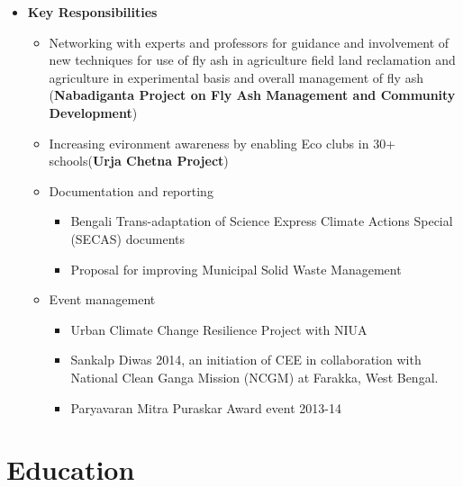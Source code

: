 \documentclass[11pt,a4paper,sans]{moderncv}        %
\begin{document}
\begin{itemize}
    \vspace{4mm}
    \item{}
    \vspace{2mm}

    \textbf{Key Responsibilities}

    \begin{itemize}
            \item Networking with experts and professors for guidance and involvement of new techniques for use of fly
                  ash in agriculture field land reclamation and agriculture in experimental basis and overall management
                  of fly ash (\textbf{Nabadiganta Project on Fly Ash Management and Community Development})
            \item Increasing evironment awareness by enabling Eco clubs in 30+ schools(\textbf{Urja Chetna Project})
            \item Documentation and reporting
            \begin{itemize}
                \item Bengali Trans-adaptation of Science Express Climate Actions Special (SECAS) documents
                \item Proposal for improving Municipal Solid Waste Management
            \end{itemize}
            \item Event management
            \begin{itemize}
                \item Urban Climate Change Resilience Project with NIUA
                \item Sankalp Diwas 2014, an initiation of CEE in collaboration with National Clean Ganga Mission (NCGM) at Farakka, West Bengal.
                \item Paryavaran Mitra Puraskar Award event 2013-14
             \end{itemize}
    \end{itemize}

\end{itemize}

\pagebreak

\section{Education}


    \vspace{5pt}
\end{document}
